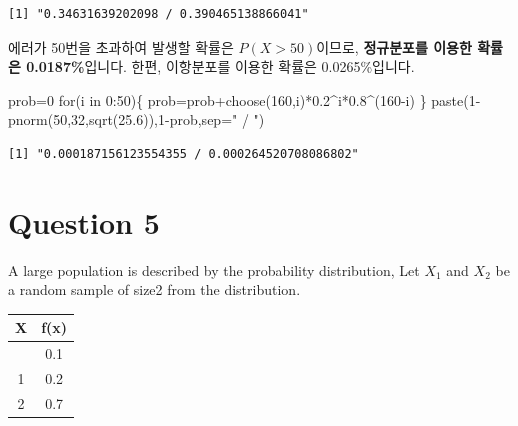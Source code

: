 \documentclass[
  letterpaper,
  DIV=11,
  numbers=noendperiod]{scrreprt}
\newenvironment{Shaded}{\begin{snugshade}}{\end{snugshade}}
\newcommand{\AttributeTok}[1]{\textcolor[rgb]{0.40,0.45,0.13}{#1}}
\newcommand{\ControlFlowTok}[1]{\textcolor[rgb]{0.00,0.23,0.31}{#1}}
\newcommand{\DecValTok}[1]{\textcolor[rgb]{0.68,0.00,0.00}{#1}}
\newcommand{\FloatTok}[1]{\textcolor[rgb]{0.68,0.00,0.00}{#1}}
\newcommand{\FunctionTok}[1]{\textcolor[rgb]{0.28,0.35,0.67}{#1}}
\newcommand{\NormalTok}[1]{\textcolor[rgb]{0.00,0.23,0.31}{#1}}
\newcommand{\OtherTok}[1]{\textcolor[rgb]{0.00,0.23,0.31}{#1}}
\newcommand{\SpecialCharTok}[1]{\textcolor[rgb]{0.37,0.37,0.37}{#1}}
\newcommand{\StringTok}[1]{\textcolor[rgb]{0.13,0.47,0.30}{#1}}
\begin{document}
\begin{verbatim}
[1] "0.34631639202098 / 0.390465138866041"
\end{verbatim}

에러가 50번을 초과하여 발생할 확률은 \(P(X>50)\)이므로,
\textbf{정규분포를 이용한 확률은 0.0187\%}입니다. 한편, 이항분포를
이용한 확률은 0.0265\%입니다.

\begin{Shaded}
\begin{Highlighting}[]
\NormalTok{prob}\OtherTok{=}\DecValTok{0}
\ControlFlowTok{for}\NormalTok{(i }\ControlFlowTok{in} \DecValTok{0}\SpecialCharTok{:}\DecValTok{50}\NormalTok{)\{}
\NormalTok{    prob}\OtherTok{=}\NormalTok{prob}\SpecialCharTok{+}\FunctionTok{choose}\NormalTok{(}\DecValTok{160}\NormalTok{,i)}\SpecialCharTok{*}\FloatTok{0.2}\SpecialCharTok{\^{}}\NormalTok{i}\SpecialCharTok{*}\FloatTok{0.8}\SpecialCharTok{\^{}}\NormalTok{(}\DecValTok{160}\SpecialCharTok{{-}}\NormalTok{i)}
\NormalTok{\}}
\FunctionTok{paste}\NormalTok{(}\DecValTok{1}\SpecialCharTok{{-}}\FunctionTok{pnorm}\NormalTok{(}\DecValTok{50}\NormalTok{,}\DecValTok{32}\NormalTok{,}\FunctionTok{sqrt}\NormalTok{(}\FloatTok{25.6}\NormalTok{)),}\DecValTok{1}\SpecialCharTok{{-}}\NormalTok{prob,}\AttributeTok{sep=}\StringTok{" / "}\NormalTok{)}
\end{Highlighting}
\end{Shaded}

\begin{verbatim}
[1] "0.000187156123554355 / 0.000264520708086802"
\end{verbatim}

\section*{Question 5}\label{question-5-2}


A large population is described by the probability distribution, Let
\(X_1\) and \(X_2\) be a random sample of size2 from the distribution.

\begin{longtable}[]{@{}cc@{}}
\toprule\noalign{}
X & f(x) \\
\midrule\noalign{}
\endhead
\bottomrule\noalign{}
\endlastfoot
0 & 0.1 \\
1 & 0.2 \\
2 & 0.7 \\
\end{longtable}
\end{document}
